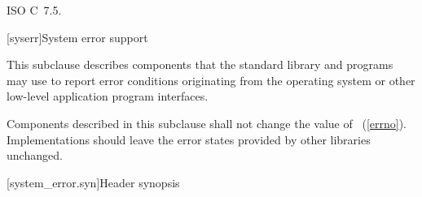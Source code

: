 \xref ISO C~7.5.

[syserr]{System error support}

\pnum
This subclause describes components that the standard library and
\Cpp programs may use to report error conditions originating from
the operating system or other low-level application program interfaces.

\pnum
Components described in this subclause shall not change the value of
~(\ref{errno}).
Implementations should leave the error states provided by other
libraries unchanged.

[system_error.syn]{Header  synopsis}
%
%
%
%
%
%
%
%
%

